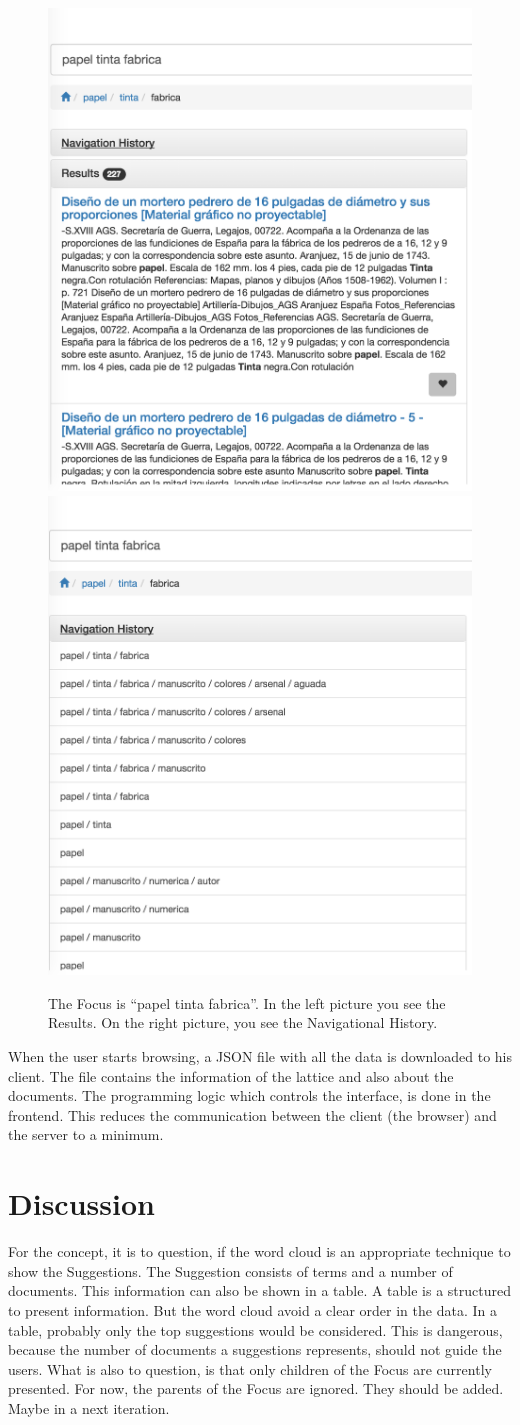 \documentclass[11pt]{report}
\begin{document}
\begin{figure}[!ht]
\includegraphics[width=.48\linewidth]{images/fancy4}\hfill
\includegraphics[width=.48\linewidth]{images/fancy3}
\caption{The Focus is ``papel tinta fabrica''. In the left picture you see the Results. On the right picture, you see the Navigational History.}
\label{figure:fancy3}
\end{figure}

When the user starts browsing, a JSON file with all the data is downloaded to his client. The file contains the information of the lattice and also about the documents. The programming logic which controls the interface, is done in the frontend. This reduces the communication between the client (the browser) and the server to a minimum.

\section{Discussion}

For the concept, it is to question, if the word cloud is an appropriate technique to show the Suggestions. The Suggestion consists of terms and a number of documents. This information can also be shown in a table. A table is a structured to present information. But the word cloud avoid a clear order in the data. In a table, probably only the top suggestions would be considered. This is dangerous, because the number of documents a suggestions represents, should not guide the users. What is also to question, is that only children of the Focus are currently presented. For now, the parents of the Focus are ignored. They should be added. Maybe in a next iteration.\\
\end{document}
